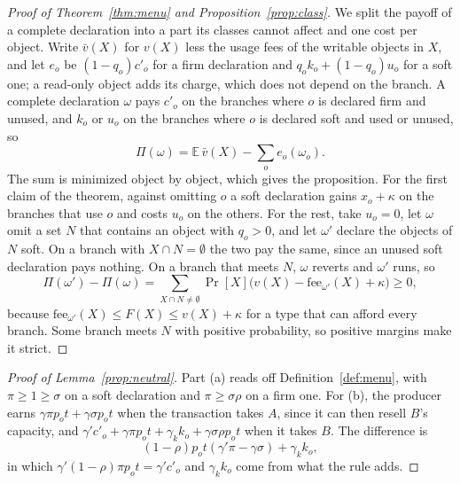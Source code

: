 \documentclass[conference,compsoc]{IEEEtran}
\numberwithin{equation}{section}
\theoremstyle{plain}
\theoremstyle{definition}
\theoremstyle{remark}
\newcommand{\cp}{c'}
\begin{document}
\begin{proof}[Proof of Theorem~\ref{thm:menu} and Proposition~\ref{prop:class}]
We split the payoff of a complete declaration into a part its classes cannot affect and one cost per object. Write $\bar v(X)$ for $v(X)$ less the usage fees of the writable objects in $X$, and let $e_o$ be $(1-q_o)\cp_o$ for a firm declaration and $q_o k_o + (1-q_o) u_o$ for a soft one; a read-only object adds its charge, which does not depend on the branch. A complete declaration $\omega$ pays $\cp_o$ on the branches where $o$ is declared firm and unused, and $k_o$ or $u_o$ on the branches where $o$ is declared soft and used or unused, so
\begin{equation}\label{eq:split}
\Pi(\omega) = \mathbb{E}\,\bar v(X) - \sum_o e_o(\omega_o).
\end{equation}
The sum is minimized object by object, which gives the proposition. For the first claim of the theorem, against omitting $o$ a soft declaration gains $x_o + \kappa$ on the branches that use $o$ and costs $u_o$ on the others. For the rest, take $u_o = 0$, let $\omega$ omit a set $N$ that contains an object with $q_o > 0$, and let $\omega'$ declare the objects of $N$ soft. On a branch with $X \cap N = \emptyset$ the two pay the same, since an unused soft declaration pays nothing. On a branch that meets $N$, $\omega$ reverts and $\omega'$ runs, so
\begin{equation*}
\Pi(\omega') - \Pi(\omega) = \sum_{X \cap N \ne \emptyset} \Pr[X]\bigl(v(X) - \mathrm{fee}_{\omega'}(X) + \kappa\bigr) \ge 0,
\end{equation*}
because $\mathrm{fee}_{\omega'}(X) \le F(X) \le v(X) + \kappa$ for a type that can afford every branch. Some branch meets $N$ with positive probability, so positive margins make it strict.
\end{proof}

\begin{proof}[Proof of Lemma~\ref{prop:neutral}]
Part (a) reads off Definition~\ref{def:menu}, with $\pi \ge 1 \ge \sigma$ on a soft declaration and $\pi \ge \sigma\rho$ on a firm one. For (b), the producer earns $\gamma\pi p_o t + \gamma\sigma p_o t$ when the transaction takes $A$, since it can then resell $B$'s capacity, and $\gamma'\cp_o + \gamma\pi p_o t + \gamma_k k_o + \gamma\sigma\rho p_o t$ when it takes $B$. The difference is
\begin{equation*}
(1-\rho) p_o t (\gamma'\pi - \gamma\sigma) + \gamma_k k_o,
\end{equation*}
in which $\gamma'(1-\rho)\pi p_o t = \gamma'\cp_o$ and $\gamma_k k_o$ come from what the rule adds.
\end{proof}
\end{document}
